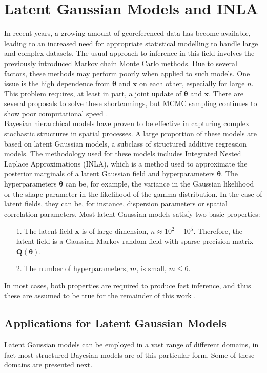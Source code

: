 \section{Latent Gaussian Models and INLA}
In recent years, a growing amount of georeferenced data has become available, leading to an increased need for appropriate statistical modelling to handle large and complex datasets. The usual approach to inference in this field involves the previously introduced Markov chain Monte Carlo methods. Due to several factors, these methods may perform poorly when applied to such models. One issue is the high dependence from $\pmb{\theta}$ and $\pmb{x}$ on each other, especially for large $n$. This problem requires, at least in part, a joint update of $\pmb{\theta}$ and $\pmb{x}$. There are several proposals to solve these shortcomings, but MCMC sampling continues to show poor computational speed \autocite[][322]{rue2009approximate}.\\
Bayesian hierarchical models have proven to be effective in capturing complex stochastic structures in spatial processes. A large proportion of these models are based on latent Gaussian models, a subclass of structured additive regression models. The methodology used for these models includes Integrated Nested Laplace Approximations (INLA), which is a method used to approximate the posterior marginals of a latent Gaussian field and hyperparameters $\pmb{\theta}$. The hyperparameters $\pmb{\theta}$ can be, for example, the variance in the Gaussian likelihood or the shape parameter in the likelihood of the gamma distribution. In the case of latent fields, they can be, for instance, dispersion parameters or spatial correlation parameters. 
Most latent Gaussian models satisfy two basic properties:
\begin{itemize}
    \item[1.] The latent field $\pmb{x}$ is of large dimension, $n\approx10^2-10^5$. Therefore, the latent field is a Gaussian Markov random field with sparse precision matrix $\pmb{Q}\left(\pmb{\theta}\right)$.
    \item[2.] The number of hyperparameters, $m$, is small, $m\leq6$.
\end{itemize}
In most cases, both properties are required to produce fast inference, and thus these are assumed to be true for the remainder of this work \autocite[][]{rue2009approximate}.
\subsection{Applications for Latent Gaussian Models}
Latent Gaussian models can be employed in a vast range of different domains, in fact most structured Bayesian models are of this particular form. Some of these domains are presented next. \clearpage
